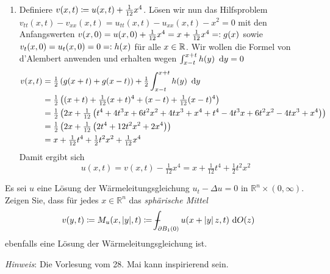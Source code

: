 \begin{exercisePage}
\begin{enumerate}[label=(zu \alph*), leftmargin=*]
	\item Definiere $v(x,t) \coloneqq u(x,t) + \frac{1}{12}x^4$. Lösen wir nun das Hilfsproblem $v_{tt}(x,t) - v_{xx}(x,t) = u_{tt}(x,t) - u_{xx}(x,t) - x^2 = 0$ mit den Anfangswerten $v(x,0) = u(x,0) + \frac{1}{12} x^4 = x + \frac{1}{12}x^4 \mathrel{=:} g(x)$ sowie $v_t(x,0) = u_t(x,0) = 0 \mathrel{=:} h(x)$ für alle $x \in \mathbb{R}$.
	Wir wollen die Formel von d'Alembert anwenden und erhalten wegen $\int_{x-t}^{x+t} h(y) \enskip \mathrm{d}y = 0$
	\begin{align*}
		v(x,t) &= \tfrac{1}{2} \left( g(x+t) + g(x-t) \right) + \tfrac{1}{2} \int_{x-t}^{x+t} h(y) \enskip \mathrm{d}y \\
		&= \tfrac{1}{2} \left(  (x+t) + \tfrac{1}{12}(x+t)^4  + (x-t) + \tfrac{1}{12}(x-t)^4 \right) \\
		&= \tfrac{1}{2} \left( 2x + \tfrac{1}{12} \left( t^4 + 4 t^3 x + 6 t^2 x^2 + 4 t x^3 + x^4 + t^4 - 4 t^3 x + 6 t^2 x^2 - 4 t x^3 + x^4 \right) \right) \\
		&=\tfrac{1}{2} \left( 2x + \tfrac{1}{12} \left( 2t^4 + 12 t^2 x^2 + 2 x^4  \right) \right) \\
		&= x + \tfrac{1}{12}t^4 + \tfrac{1}{2} t^2x^2 + \tfrac{1}{12} x^4
	\end{align*} 
	Damit ergibt sich
	\begin{equation*}
		u(x,t) = v(x,t) - \tfrac{1}{12}x^4 = x + \tfrac{1}{12} t^4 + \tfrac{1}{2} t^2x^2
	\end{equation*}
\end{enumerate}


\begin{task}
	Es sei $u$ eine Lösung der Wärmeleitungsgleichung $u_t-\Delta u=0$ in $\mathbb R^n\times (0,\infty)$. Zeigen Sie, dass für jedes $x\in \mathbb R^n$ das \textit{sphärische Mittel}
	\begin{equation*}
		v(y,t) \defeq M_u(x,|y|, t) \defeq \dashint_{\partial B_1(0)} u(x + \abs{y} z, t) \ \mathrm{d} O(z)
	\end{equation*}
	ebenfalls eine Lösung der Wärmeleitungsgleichung ist.
	
	\textit{Hinweis}: Die Vorlesung vom 28. Mai kann inspirierend sein.
\end{task}

	
\end{exercisePage}